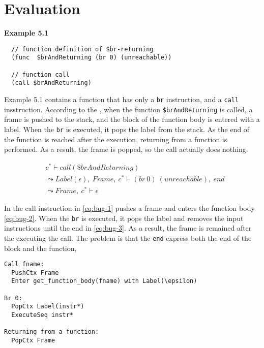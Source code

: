 
\chapter{Evaluation}
\label{ch:eval}
\noindent


\textbf{Example 5.1}
\begin{verbatim}
  // function definition of $br-returning
  (func  $brAndReturning (br 0) (unreachable))

  // function call
  (call $brAndReturning)
\end{verbatim}

Example 5.1 contains a function that has only a \texttt{br} instruction, and a
\texttt{call} insstruction.
According to the \officialp{}, when the function \texttt{\$brAndReturning} is
called, a frame is pushed to the stack, and the block of the function
body is entered with a label.
When the \texttt{br} is executed, it pops the label from the stack.
As the end of the function is reached after the execution, returning from a
function is performed.
As a result, the frame is popped, so the call actually does nothing.


\begin{align}
  &c^* \vdash call(\$brAndReturning) \label{eq:bug-1} \\
&\leadsto
  Label(\epsilon), ~ Frame, ~ c^* \vdash (br ~ 0) ~ (unreachable), ~ end \label{eq:bug-2} \\
&\leadsto
  Frame, ~ c^* \vdash \epsilon \label{eq:bug-3}
\end{align}

In \spectecp{} the call instruction in \cref{eq:bug-1} pushes a frame and
enters the function body \cref{eq:bug-2}.
When the \texttt{br} is executed, it pops the label and removes the input
instructions until the end in \cref{eq:bug-3}.
As a result, the frame is remained after the executing the call.
The problem is that the \texttt{end} express both the end of the block and the
function, 




\begin{verbatim}
Call fname:
  PushCtx Frame
  Enter get_function_body(fname) with Label(\epsilon)

Br 0:
  PopCtx Label(instr*)
  ExecuteSeq instr*

Returning from a function:
  PopCtx Frame
\end{verbatim}

